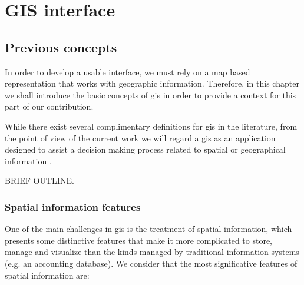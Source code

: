 \part{GIS interface}
\chapter{Previous concepts}
    In order to develop a usable interface, we must rely on a map based representation that works with geographic information. Therefore, in this chapter we shall introduce the basic concepts of \gls{gis} in order to provide a context for this part of our contribution.
    
    While there exist several complimentary definitions for \gls{gis} in the literature, from the point of view of the current work we will regard a \gls{gis} as an application designed to assist a decision making process related to spatial or geographical information \cite{harmon2003design,longley2015geographic}.
    
    BRIEF OUTLINE.
    
    \section{Spatial information features}
    One of the main challenges in \gls{gis} is the treatment of spatial information, which presents some distinctive features that make it more complicated to store, manage and visualize than the kinds managed by traditional information systems (e.g. an accounting database). We consider that the most significative features of spatial information are:
    
